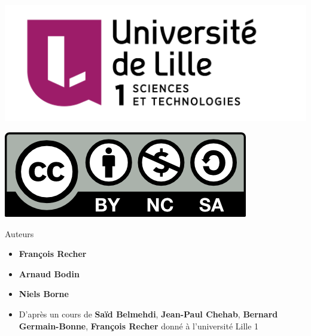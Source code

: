 







\begin{frame}

\thispagestyle{empty}    

  \hspace*{-20ex}
  \begin{minipage}{0.5\textwidth}
  \begin{center}
    \vspace*{5ex}   


    \bigskip


    \includegraphics[scale=0.13]{../divers/Logo-Univ-Lille-1-new.png}

    

    \vspace*{5ex}

    \includegraphics[scale=0.5]{../divers/by-nc-sa.png}
  \end{center}
  \end{minipage}
  \hfil
  \begin{minipage}{0.75\textwidth}
  \vspace*{5ex}
  Auteurs
  \begin{itemize}
    \item {\bf François Recher}
    \item {\bf Arnaud Bodin}
    \item {\bf Niels Borne} 
    \item \small D'après un cours de {\bf Saïd Belmehdi}, {\bf Jean-Paul Chehab}, 
    {\bf Bernard Germain-Bonne}, {\bf François Recher} donné à l'université Lille 1
  \end{itemize}


\end{minipage}
\end{frame}
